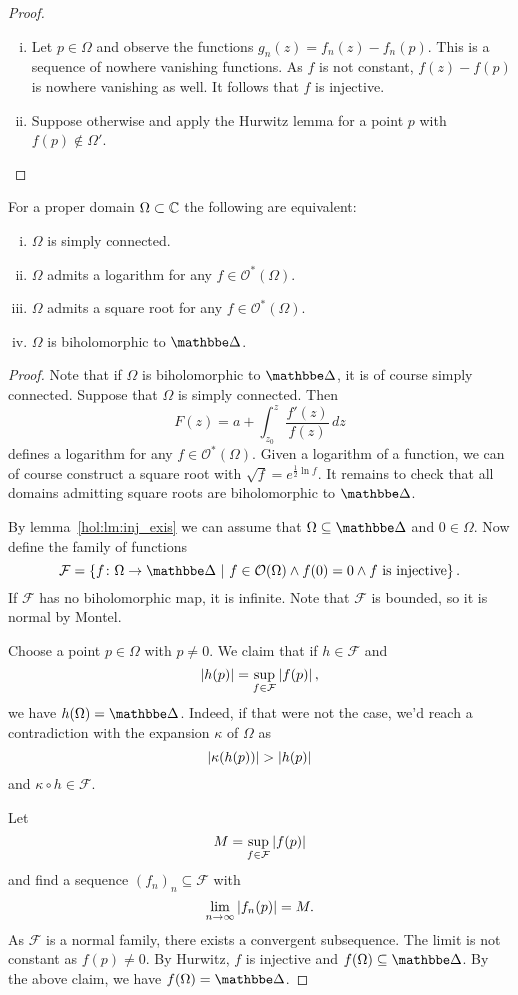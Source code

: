 \begin{proof}
\phantom{a}
\begin{enumerate}[i)]
\item Let $p \in \Omega$ and observe the functions
$g_n(z) = f_n(z) - f_n(p)$. This is a sequence of nowhere vanishing
functions. As $f$ is not constant, $f(z) - f(p)$ is nowhere
vanishing as well. It follows that $f$ is injective.
\item Suppose otherwise and apply the Hurwitz lemma for a point
$p$ with $f(p) \not \in \Omega'$. \qedhere
\end{enumerate}
\end{proof}

\begin{izrek}
For a proper domain $\Omega \subset \mathbb{C}$ the following are
equivalent:

\begin{enumerate}[i)]
\item $\Omega$ is simply connected.
\item $\Omega$ admits a logarithm for any
$f \in \mathcal{O}^*(\Omega)$.
\item $\Omega$ admits a square root for any
$f \in \mathcal{O}^*(\Omega)$.
\item $\Omega$ is biholomorphic to $\dsk$.
\end{enumerate}
\end{izrek}

\begin{proof}
Note that if $\Omega$ is biholomorphic to $\dsk$, it is of course
simply connected. Suppose that $\Omega$ is simply connected. Then
\[
F(z) = a + \int_{z_0}^z \frac{f'(z)}{f(z)}\,dz
\]
defines a logarithm for any $f \in \mathcal{O}^*(\Omega)$. Given a
logarithm of a function, we can of course construct a square root
with $\sqrt{f} = e^{\frac{1}{2} \ln f}$. It remains to check that
all domains admitting square roots are biholomorphic to $\dsk$.

By lemma~\ref{hol:lm:inj_exis} we can assume that
$\Omega \subseteq \dsk$ and $0 \in \Omega$. Now define the family
of functions
\[
\mathcal{F} = \setb{f \colon \Omega \to \dsk}
{f \in \mathcal{O}(\Omega) \land
f(0) = 0 \land \text{$f$ is injective}}.
\]
If $\mathcal{F}$ has no biholomorphic map, it is infinite. Note
that $\mathcal{F}$ is bounded, so it is normal by Montel.

Choose a point $p \in \Omega$ with $p \ne 0$. We claim that if
$h \in \mathcal{F}$ and
\[
\left\lvert h(p)\right\rvert = \sup_{f \in \mathcal{F}} \left\lvert f(p)\right\rvert,
\]
we have $h(\Omega) = \dsk$. Indeed, if that were not the case, we'd
reach a contradiction with the expansion $\kappa$ of $\Omega$ as
\[
\left\lvert \kappa(h(p))\right\rvert > \left\lvert h(p)\right\rvert
\]
and $\kappa \circ h \in \mathcal{F}$.

Let
\[
M = \sup_{f \in \mathcal{F}} \left\lvert f(p)\right\rvert
\]
and find a sequence $(f_n)_n \subseteq \mathcal{F}$ with
\[
\lim_{n \to \infty} \left\lvert f_n(p)\right\rvert = M.
\]
As $\mathcal{F}$ is a normal family, there exists a convergent
subsequence. The limit is not constant as $f(p) \ne 0$. By Hurwitz,
$f$ is injective and $f(\Omega) \subseteq \dsk$. By the above
claim, we have $f(\Omega) = \dsk$.
\end{proof}
